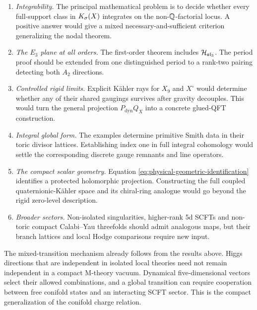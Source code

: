 \begin{enumerate}
 \item \emph{Integrability.} The principal mathematical problem is to decide
 whether every full-support class in $K_{\sigma}(X)$ integrates on the
 non-$\mathbb Q$-factorial locus. A positive answer would give a mixed
 necessary-and-sufficient criterion generalizing the nodal theorem.

 \item \emph{The $E_3$ plane at all orders.} The first-order theorem includes
 $\mathcal H_{\mathfrak{sl}_3}$. The period proof should be extended from one
 distinguished period to a rank-two pairing detecting both $A_2$ directions.

 \item \emph{Controlled rigid limits.} Explicit K\"ahler rays for $X_9$ and
 $X^{\circ}$ would determine whether any of their shared gaugings survives
 after gravity decouples. This would turn the general projection
 $P_{\mathrm{dyn}}Q_X$ into a concrete glued-QFT construction.

 \item \emph{Integral global form.} The examples determine primitive Smith
 data in their toric divisor lattices. Establishing index one in full integral
 cohomology would settle the corresponding discrete gauge remnants and line
 operators.

 \item \emph{The compact scalar geometry.} Equation
 \eqref{eq:physical-geometric-identification} identifies a protected
 holomorphic projection. Constructing the full coupled
 quaternionic-K\"ahler space and its chiral-ring analogue would go beyond the
 rigid zero-level description.

 \item \emph{Broader sectors.} Non-isolated singularities, higher-rank 5d
 SCFTs and non-toric compact Calabi--Yau threefolds should admit analogous
 maps, but their branch lattices and local Hodge comparisons require new
 input.
\end{enumerate}

The mixed-transition mechanism already follows from the results above. Higgs
directions that are independent in isolated local theories need not remain
independent in a compact M-theory vacuum. Dynamical five-dimensional vectors
select their allowed combinations, and a global transition can require
cooperation between free conifold states and an interacting SCFT sector. This
is the compact generalization of the conifold charge relation.
